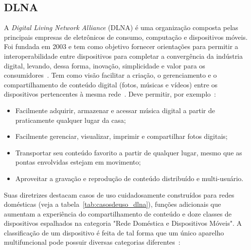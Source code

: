 \subsection{DLNA}

A \emph{Digital Living Network Alliance} (DLNA) é uma organização composta pelas principais empresas de eletrônicos de consumo, computação e dispositivos móveis. Foi fundada em 2003 e tem como objetivo fornecer orientações para permitir a interoperabilidade entre dispositivos para completar a convergência da indústria digital, levando, dessa forma, inovação, simplicidade e valor para os consumidores~\cite{dlnaoverview}. Tem como visão facilitar a criação, o gerenciamento e o compartilhamento de conteúdo digital (fotos, músicas e vídeos) entre os dispositivos pertencentes à mesma rede~\cite{dlnahdvideostreaming}. Deve permitir, por exemplo~\cite{dlnaoverview}:

\begin{itemize}
	\item Facilmente adquirir, armazenar e acessar música digital a partir de praticamente qualquer lugar da casa;
	\item Facilmente gerenciar, visualizar, imprimir e compartilhar fotos digitais;
	\item Transportar seu conteúdo favorito a partir de qualquer lugar, mesmo que as pontas envolvidas estejam em movimento;
	\item Aproveitar a gravação e reprodução de conteúdo distribuído e multi-usuário.
\end{itemize}

Suas diretrizes destacam casos de uso cuidadosamente construídos para redes domésticas (veja a tabela~\ref{tab:casosdeuso_dlna}), funções adicionais que aumentam a experiência do compartilhamento de conteúdo e doze classes de dispositivos espalhados na categoria "Rede Doméstica e Dispositivos Móveis". A classificação de um dispositivo é feita de tal forma que um único aparelho multifuncional pode possuir diversas categorias diferentes~\cite{dlnahdvideostreaming, dlnaclasses}:

